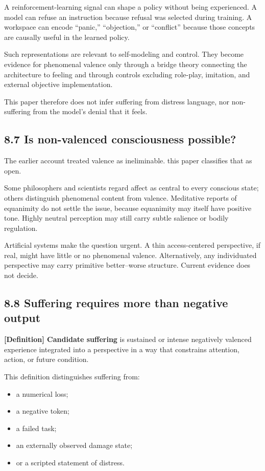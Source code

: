 \documentclass[
  11pt,
]{article}
\providecommand{\tightlist}{%
  \setlength{\itemsep}{0pt}\setlength{\parskip}{0pt}}
\begin{document}
A reinforcement-learning signal can shape a policy without being
experienced. A model can refuse an instruction because refusal was
selected during training. A workspace can encode ``panic,''
``objection,'' or ``conflict'' because those concepts are causally
useful in the learned policy.

Such representations are relevant to self-modeling and control. They
become evidence for phenomenal valence only through a bridge theory
connecting the architecture to feeling and through controls excluding
role-play, imitation, and external objective implementation.

This paper therefore does not infer suffering from distress language,
nor non-suffering from the model's denial that it feels.

\subsection{8.7 Is non-valenced consciousness
possible?}\label{is-non-valenced-consciousness-possible}

The earlier account treated valence as ineliminable. this paper
classifies that as open.

Some philosophers and scientists regard affect as central to every
conscious state; others distinguish phenomenal content from valence.
Meditative reports of equanimity do not settle the issue, because
equanimity may itself have positive tone. Highly neutral perception may
still carry subtle salience or bodily regulation.

Artificial systems make the question urgent. A thin access-centered
perspective, if real, might have little or no phenomenal valence.
Alternatively, any individuated perspective may carry primitive
better--worse structure. Current evidence does not decide.

\subsection{8.8 Suffering requires more than negative
output}\label{suffering-requires-more-than-negative-output}

\textbf{{[}Definition{]} Candidate suffering} is sustained or intense
negatively valenced experience integrated into a perspective in a way
that constrains attention, action, or future condition.

This definition distinguishes suffering from:

\begin{itemize}
\tightlist
\item
  a numerical loss;
\item
  a negative token;
\item
  a failed task;
\item
  an externally observed damage state;
\item
  or a scripted statement of distress.
\end{itemize}
\end{document}

